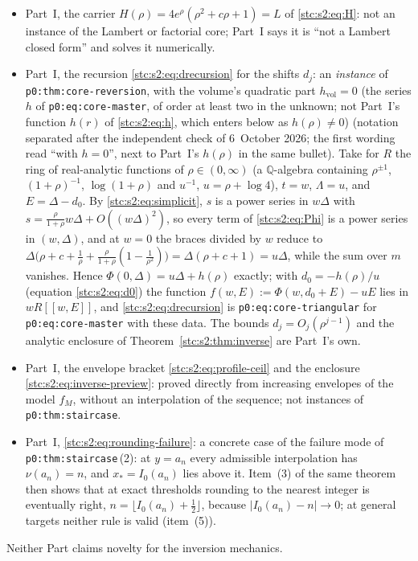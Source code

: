 \documentclass[11pt,letterpaper]{article}
\numberwithin{equation}{section}
\theoremstyle{remark}\newtheorem{remark}[theorem]{Remark}
\newcommand{\file}[1]{\nolinkurl{#1}}
\begin{document}
\begin{itemize}
\item Part~I, the carrier $H(\rho)=4e^\rho(\rho^2+c\rho+1)=L$ of \eqref{stc:s2:eq:H}: not an instance of the Lambert or factorial core; Part~I says it is ``not a Lambert closed form'' and solves it numerically.
\item Part~I, the recursion \eqref{stc:s2:eq:drecursion} for the shifts $d_j$: an \emph{instance} of \file{p0:thm:core-reversion}, with the volume's quadratic part $h_{\mathrm{vol}}=0$ (the series $h$ of \file{p0:eq:core-master}, of order at least two in the unknown; not Part~I's function $h(r)$ of \eqref{stc:s2:eq:h}, which enters below as $h(\rho)\ne0$) \textup{(notation separated after the independent check of 6~October 2026; the first wording read ``with $h=0$'', next to Part~I's $h(\rho)$ in the same bullet)}. Take for $R$ the ring of real-analytic functions of $\rho\in(0,\infty)$ (a $\mathbb Q$-algebra containing $\rho^{\pm1}$, $(1+\rho)^{-1}$, $\log(1+\rho)$ and $u^{-1}$, $u=\rho+\log4$), $t=w$, $\Lambda=u$, and $E=\Delta-d_0$. By \eqref{stc:s2:eq:simplicit}, $s$ is a power series in $w\Delta$ with $s=\frac\rho{1+\rho}w\Delta+O((w\Delta)^2)$, so every term of \eqref{stc:s2:eq:Phi} is a power series in $(w,\Delta)$, and at $w=0$ the braces divided by $w$ reduce to $\Delta\bigl(\rho+c+\frac1\rho+\frac\rho{1+\rho}(1-\frac1{\rho^2})\bigr)=\Delta(\rho+c+1)=u\Delta$, while the sum over $m$ vanishes. Hence $\Phi(0,\Delta)=u\Delta+h(\rho)$ exactly; with $d_0=-h(\rho)/u$ (equation \eqref{stc:s2:eq:d0}) the function $f(w,E):=\Phi(w,d_0+E)-uE$ lies in $wR[[w,E]]$, and \eqref{stc:s2:eq:drecursion} is \file{p0:eq:core-triangular} for \file{p0:eq:core-master} with these data. The bounds $d_j=O_j(\rho^{j-1})$ and the analytic enclosure of Theorem~\ref{stc:s2:thm:inverse} are Part~I's own.
\item Part~I, the envelope bracket \eqref{stc:s2:eq:profile-ceil} and the enclosure \eqref{stc:s2:eq:inverse-preview}: proved directly from increasing envelopes of the model $f_M$, without an interpolation of the sequence; not instances of \file{p0:thm:staircase}.
\item Part~I, \eqref{stc:s2:eq:rounding-failure}: a concrete case of the failure mode of \file{p0:thm:staircase}\,(2): at $y=a_n$ every admissible interpolation has $\nu(a_n)=n$, and $x_\ast=I_0(a_n)$ lies above it. Item~(3) of the same theorem then shows that at exact thresholds rounding to the nearest integer is eventually right, $n=\lfloor I_0(a_n)+\frac12\rfloor$, because $|I_0(a_n)-n|\to0$; at general targets neither rule is valid (item~(5)).
\end{itemize}
Neither Part claims novelty for the inversion mechanics.
\end{document}
